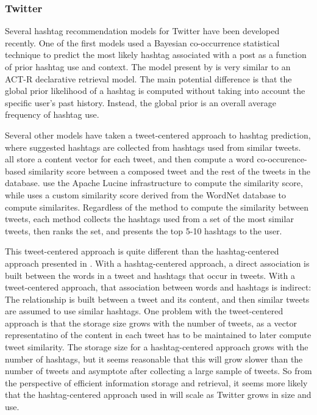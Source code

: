 \documentclass[man]{apa6}
\begin{document}
\subsubsection{Twitter}

Several hashtag recommendation models for Twitter have been developed recently.
One of the first models used a Bayesian co-occurrence statistical technique to predict the most likely hashtag associated with a post as a function of prior hashtag use and context. \parencite{Mazzia2009}
The model present by \textcite{Mazzia2009} is very similar to an ACT-R declarative retrieval model.
The main potential difference is that the global prior likelihood of a hashtag is computed without taking into account the specific user's past history.
Instead, the global prior is an overall average frequency of hashtag use.

Several other models have taken a tweet-centered approach to hashtag prediction, where suggested hashtags are collected from hashtags used from similar tweets.
\textcites{Li2011, Zangerle2011, Kywe2012} all store a content vector for each tweet, and then compute a word co-occurence-based similarity score between a composed tweet and the rest of the tweets in the database.
\textcites{Zangerle2011, Kywe2012} use the Apache Lucine infrastructure to compute the similarity score, while \textcite{Li2011} uses a custom similarity score derived from the WordNet database to compute similarites.
Regardless of the method to compute the similarity between tweets, each method collects the hashtags used from a set of the most similar tweets, then ranks the set, and presents the top 5-10 hashtags to the user.

This tweet-centered approach is quite different than the hashtag-centered approach presented in \textcite{Mazzia2009}.
With a hashtag-centered approach, a direct association is built between the words in a tweet and hashtags that occur in tweets.
With a tweet-centered approach, that association between words and hashtags is indirect:
The relationship is built between a tweet and its content, and then similar tweets are assumed to use similar hashtags.
One problem with the tweet-centered approach is that the storage size grows with the number of tweets, as a vector representatino of the content in each tweet has to be maintained to later compute tweet similarity.
The storage size for a hashtag-centered approach grows with the number of hashtags, but it seems reasonable that this will grow slower than the number of tweets and asymptote after collecting a large sample of tweets.
So from the perspective of efficient information storage and retrieval, it seems more likely that the hashtag-centered approach used in \textcite{Mazzia2009} will scale as Twitter grows in size and use.
\end{document}
